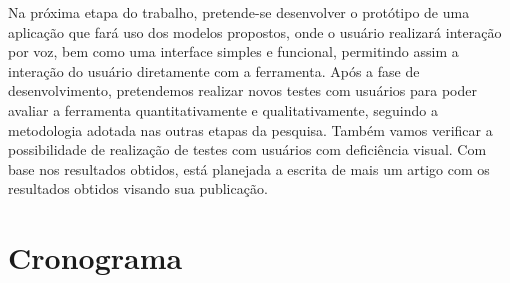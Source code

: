 \documentclass[
	12pt,				%
	openright,			%
	oneside,			%
	a4paper,			%
	english,			%
	brazil				%
	]{abntex2}
\begin{document}
Na próxima etapa do trabalho, pretende-se desenvolver o protótipo de uma aplicação que fará uso dos modelos propostos, onde o usuário realizará interação por voz, bem como uma interface simples e funcional, permitindo assim a interação do usuário diretamente com a ferramenta. Após a fase de desenvolvimento, pretendemos realizar novos testes com usuários para poder avaliar a ferramenta quantitativamente e qualitativamente, seguindo a metodologia adotada nas outras etapas da pesquisa. Também vamos verificar a possibilidade de realização de testes com usuários com deficiência visual. Com base nos resultados obtidos, está planejada a escrita de mais um artigo com os resultados obtidos visando sua publicação. 


\chapter{Cronograma}

\end{document}
